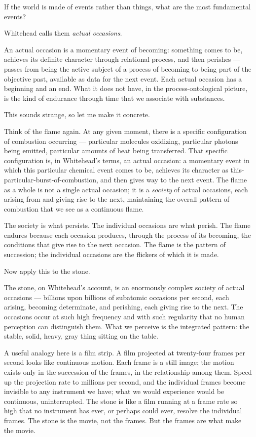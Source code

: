 If the world is made of events rather than things, what are the
most fundamental events?

Whitehead calls them \emph{actual occasions}.

An actual occasion is a momentary event of becoming: something comes to be,
achieves its definite character through relational process, and then perishes
--- passes from being the active subject of a process of becoming to being
part of the objective past, available as data for the next event.
Each actual occasion has a beginning and an end.
What it does not have, in the process-ontological picture, is the kind of
endurance through time that we associate with substances.

This sounds strange, so let me make it concrete.

Think of the flame again.
At any given moment, there is a specific configuration of combustion occurring
--- particular molecules oxidizing, particular photons being emitted,
particular amounts of heat being transferred.
That specific configuration is, in Whitehead's terms, an actual occasion:
a momentary event in which this particular chemical event comes to be,
achieves its character as this-particular-burst-of-combustion, and then
gives way to the next event.
The flame as a whole is not a single actual occasion; it is a \emph{society}
of actual occasions, each arising from and giving rise to the next,
maintaining the overall pattern of combustion that we see as a continuous flame.

The society is what persists.
The individual occasions are what perish.
The flame endures because each occasion produces, through the process
of its becoming, the conditions that give rise to the next occasion.
The flame is the pattern of succession; the individual occasions are the
flickers of which it is made.

Now apply this to the stone.

The stone, on Whitehead's account, is an enormously complex society
of actual occasions --- billions upon billions of subatomic occasions per
second, each arising, becoming determinate, and perishing, each giving rise
to the next.
The occasions occur at such high frequency and with such regularity that
no human perception can distinguish them.
What we perceive is the integrated pattern: the stable, solid, heavy,
gray thing sitting on the table.

A useful analogy here is a film strip.
A film projected at twenty-four frames per second looks like continuous motion.
Each frame is a still image; the motion exists only in the succession of
the frames, in the relationship among them.
Speed up the projection rate to millions per second, and the individual
frames become invisible to any instrument we have; what we would experience
would be continuous, uninterrupted.
The stone is like a film running at a frame rate so high that no instrument
has ever, or perhaps could ever, resolve the individual frames.
The stone is the movie, not the frames.
But the frames are what make the movie.


